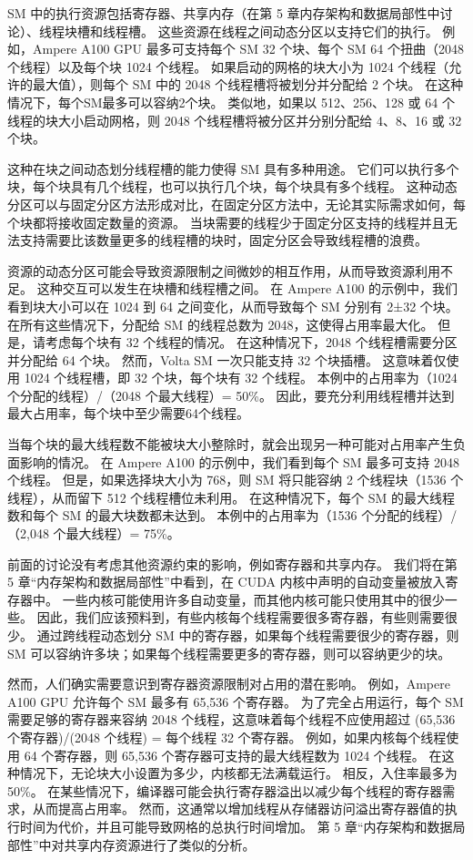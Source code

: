 SM 中的执行资源包括寄存器、共享内存（在第 5 章内存架构和数据局部性中讨论）、线程块槽和线程槽。 这些资源在线程之间动态分区以支持它们的执行。 例如，Ampere A100 GPU 最多可支持每个 SM 32 个块、每个 SM 64 个扭曲（2048 个线程）以及每个块 1024 个线程。 如果启动的网格的块大小为 1024 个线程（允许的最大值），则每个 SM 中的 2048 个线程槽将被划分并分配给 2 个块。 在这种情况下，每个SM最多可以容纳2个块。 类似地，如果以 512、256、128 或 64 个线程的块大小启动网格，则 2048 个线程槽将被分区并分别分配给 4、8、16 或 32 个块。

这种在块之间动态划分线程槽的能力使得 SM 具有多种用途。 它们可以执行多个块，每个块具有几个线程，也可以执行几个块，每个块具有多个线程。 这种动态分区可以与固定分区方法形成对比，在固定分区方法中，无论其实际需求如何，每个块都将接收固定数量的资源。 当块需要的线程少于固定分区支持的线程并且无法支持需要比该数量更多的线程槽的块时，固定分区会导致线程槽的浪费。

资源的动态分区可能会导致资源限制之间微妙的相互作用，从而导致资源利用不足。 这种交互可以发生在块槽和线程槽之间。 在 Ampere A100 的示例中，我们看到块大小可以在 1024 到 64 之间变化，从而导致每个 SM 分别有 2±32 个块。 在所有这些情况下，分配给 SM 的线程总数为 2048，这使得占用率最大化。 但是，请考虑每个块有 32 个线程的情况。 在这种情况下，2048 个线程槽需要分区并分配给 64 个块。 然而，Volta SM 一次只能支持 32 个块插槽。 这意味着仅使用 1024 个线程槽，即 32 个块，每个块有 32 个线程。 本例中的占用率为（1024 个分配的线程）/（2048 个最大线程）= 50\%。 因此，要充分利用线程槽并达到最大占用率，每个块中至少需要64个线程。

当每个块的最大线程数不能被块大小整除时，就会出现另一种可能对占用率产生负面影响的情况。 在 Ampere A100 的示例中，我们看到每个 SM 最多可支持 2048 个线程。 但是，如果选择块大小为 768，则 SM 将只能容纳 2 个线程块（1536 个线程），从而留下 512 个线程槽位未利用。 在这种情况下，每个 SM 的最大线程数和每个 SM 的最大块数都未达到。 本例中的占用率为（1536 个分配的线程）/（2,048 个最大线程）= 75\%。

前面的讨论没有考虑其他资源约束的影响，例如寄存器和共享内存。 我们将在第 5 章“内存架构和数据局部性”中看到，在 CUDA 内核中声明的自动变量被放入寄存器中。 一些内核可能使用许多自动变量，而其他内核可能只使用其中的很少一些。 因此，我们应该预料到，有些内核每个线程需要很多寄存器，有些则需要很少。 通过跨线程动态划分 SM 中的寄存器，如果每个线程需要很少的寄存器，则 SM 可以容纳许多块；如果每个线程需要更多的寄存器，则可以容纳更少的块。

然而，人们确实需要意识到寄存器资源限制对占用的潜在影响。 例如，Ampere A100 GPU 允许每个 SM 最多有 65,536 个寄存器。 为了完全占用运行，每个 SM 需要足够的寄存器来容纳 2048 个线程，这意味着每个线程不应使用超过 (65,536 个寄存器)/(2048 个线程) = 每个线程 32 个寄存器。 例如，如果内核每个线程使用 64 个寄存器，则 65,536 个寄存器可支持的最大线程数为 1024 个线程。 在这种情况下，无论块大小设置为多少，内核都无法满载运行。 相反，入住率最多为50\%。 在某些情况下，编译器可能会执行寄存器溢出以减少每个线程的寄存器需求，从而提高占用率。 然而，这通常以增加线程从存储器访问溢出寄存器值的执行时间为代价，并且可能导致网格的总执行时间增加。 第 5 章“内存架构和数据局部性”中对共享内存资源进行了类似的分析。

